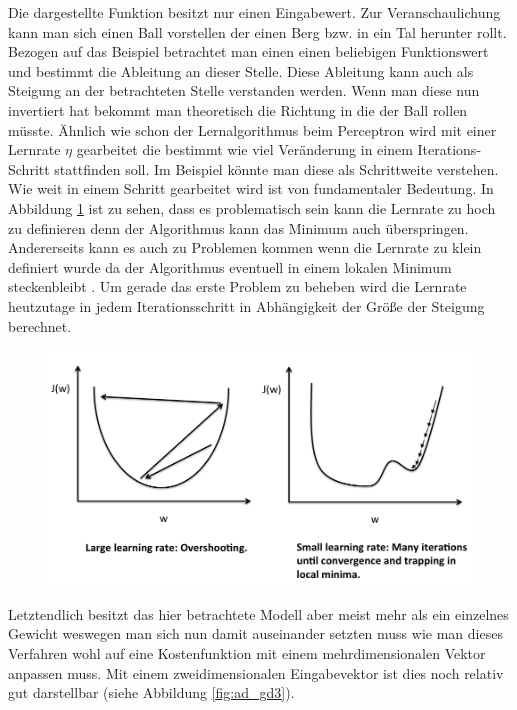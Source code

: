 Die dargestellte Funktion besitzt nur einen Eingabewert. Zur Veranschaulichung kann man sich einen Ball vorstellen der einen Berg bzw. in ein Tal herunter rollt. Bezogen auf das Beispiel betrachtet man einen einen beliebigen Funktionswert und bestimmt die Ableitung an dieser Stelle. Diese Ableitung kann auch als \glqq Steigung \grqq an der betrachteten Stelle verstanden werden. Wenn man diese nun invertiert hat bekommt man theoretisch die \glqq Richtung \grqq in die der Ball rollen müsste. Ähnlich wie schon der Lernalgorithmus beim Perceptron wird mit einer Lernrate ${\eta}$ gearbeitet die bestimmt wie viel Veränderung in einem Iterations-Schritt stattfinden soll. Im Beispiel könnte man diese als Schrittweite verstehen. 
Wie weit in einem Schritt gearbeitet wird ist von fundamentaler Bedeutung. In Abbildung \ref{fig:ad_gd2} ist zu sehen, dass es problematisch sein kann die Lernrate zu hoch zu definieren denn der Algorithmus kann das Minimum auch überspringen. Andererseits kann es auch zu Problemen kommen wenn die Lernrate zu klein definiert wurde da der Algorithmus eventuell in einem lokalen Minimum \glqq steckenbleibt \grqq . Um gerade das erste Problem zu beheben wird die Lernrate heutzutage in jedem Iterationsschritt in Abhängigkeit der Größe der Steigung berechnet.

\begin{figure}[!htb]
	\centering
	\includegraphics[width=\linewidth]{img/adeline_learning_rate}
	\label{fig:ad_gd2}
\end{figure}

Letztendlich besitzt das hier betrachtete Modell aber meist mehr als ein einzelnes Gewicht weswegen man sich nun damit auseinander setzten muss wie man dieses Verfahren wohl auf eine Kostenfunktion mit einem mehrdimensionalen Vektor anpassen muss. Mit einem zweidimensionalen Eingabevektor ist dies noch relativ gut darstellbar (siehe Abbildung \ref{fig:ad_gd3}).

